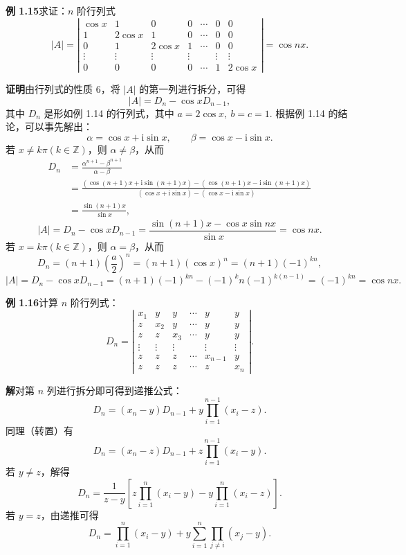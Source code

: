 \documentclass[UTF8,12pt,a4paper,fontset=fandol]{ctexart}
\begin{document}
\noindent\textbf{例 1.15}\quad 求证：$n$ 阶行列式
\[
|A|=\left|\begin{array}{ccccccc}
\cos x & 1 & 0 & 0 & \cdots & 0 & 0\\
1 & 2\cos x & 1 & 0 & \cdots & 0 & 0\\
0 & 1 & 2\cos x & 1 & \cdots & 0 & 0\\
\vdots & \vdots & \vdots & \vdots &        & \vdots & \vdots\\
0 & 0 & 0 & 0 & \cdots & 1 & 2\cos x
\end{array}\right|
=\cos nx.
\]

\noindent\textbf{证明}\quad 由行列式的性质 6，将 $|A|$ 的第一列进行拆分，可得
\[
|A|=D_n-\cos xD_{n-1},
\]
其中 $D_n$ 是形如例 1.14 的行列式，其中 $a=2\cos x,\ b=c=1$. 根据例 1.14 的结论，可以事先解出：
\[
\alpha=\cos x+\mathrm{i}\sin x,\qquad \beta=\cos x-\mathrm{i}\sin x.
\]
若 $x\ne k\pi(k\in\mathbb{Z})$，则 $\alpha\ne\beta$，从而
\[
\begin{aligned}
D_n
&=\frac{\alpha^{n+1}-\beta^{n+1}}{\alpha-\beta}\\
&=\frac{(\cos(n+1)x+\mathrm{i}\sin(n+1)x)-(\cos(n+1)x-\mathrm{i}\sin(n+1)x)}
{(\cos x+\mathrm{i}\sin x)-(\cos x-\mathrm{i}\sin x)}\\
&=\frac{\sin(n+1)x}{\sin x},
\end{aligned}
\]
\[
|A|=D_n-\cos xD_{n-1}
=\frac{\sin(n+1)x-\cos x\sin nx}{\sin x}
=\cos nx.
\]
若 $x=k\pi(k\in\mathbb{Z})$，则 $\alpha=\beta$，从而
\[
D_n=(n+1)\left(\frac a2\right)^n=(n+1)(\cos x)^n=(n+1)(-1)^{kn},
\]
\[
|A|=D_n-\cos xD_{n-1}
=(n+1)(-1)^{kn}-(-1)^k n(-1)^{k(n-1)}
=(-1)^{kn}=\cos nx.
\]

\noindent\textbf{例 1.16}\quad 计算 $n$ 阶行列式：
\[
D_n=\left|\begin{array}{cccccc}
x_1 & y & y & \cdots & y & y\\
z & x_2 & y & \cdots & y & y\\
z & z & x_3 & \cdots & y & y\\
\vdots & \vdots & \vdots &        & \vdots & \vdots\\
z & z & z & \cdots & x_{n-1} & y\\
z & z & z & \cdots & z & x_n
\end{array}\right|.
\]

\noindent\textbf{解}\quad 对第 $n$ 列进行拆分即可得到递推公式：
\[
D_n=(x_n-y)D_{n-1}+y\prod_{i=1}^{n-1}(x_i-z).
\]
同理（转置）有
\[
D_n=(x_n-z)D_{n-1}+z\prod_{i=1}^{n-1}(x_i-y).
\]
若 $y\ne z$，解得
\[
D_n=\frac1{z-y}\left[z\prod_{i=1}^n(x_i-y)-y\prod_{i=1}^n(x_i-z)\right].
\]
若 $y=z$，由递推可得
\[
D_n=\prod_{i=1}^n(x_i-y)+y\sum_{i=1}^n\prod_{j\ne i}(x_j-y).
\]
\end{document}
